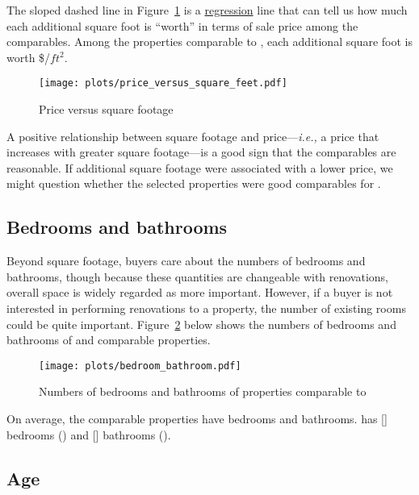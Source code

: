 \documentclass[
12pt, %
letterpaper, %
oneside, %
headinclude,footinclude, %
BCOR5mm, %
]{scrartcl}
\begin{document}
The sloped dashed line in Figure~\ref{fig:price_versus_square_feet} is a \href{https://en.wikipedia.org/wiki/Linear_regression}{regression} line that can tell us how much each additional square foot is ``worth'' in terms of sale price among the comparables.
Among the properties comparable to \PropertyName{}, each additional square foot is worth \$\MarginalPricePerFoot{}/$ft^2$. 

\begin{figure}
\centering
\caption{Price versus square footage} \label{fig:price_versus_square_feet}  
\texttt{[image: plots/price\_versus\_square\_feet.pdf]} 
\end{figure}

A positive relationship between square footage and price---\textit{i.e.,} a price that increases with greater square footage---is a good sign that the comparables are reasonable. If additional square footage were associated with a lower price, we might question whether the selected properties were good comparables for \PropertyName{}. 

\subsection{Bedrooms and bathrooms}
Beyond square footage, buyers care about the numbers of bedrooms and bathrooms, though because these quantities are changeable with renovations, overall space is widely regarded as more important.
However, if a buyer is not interested in performing renovations to a property, the number of existing rooms could be quite important.
Figure~\ref{fig:bedroom_bathroom} below shows the numbers of bedrooms and bathrooms of \PropertyName{} and comparable properties. 

\begin{figure}
\centering
\caption{Numbers of bedrooms and bathrooms of properties comparable to \PropertyName{}} \label{fig:bedroom_bathroom}  
\texttt{[image: plots/bedroom\_bathroom.pdf]} 
\end{figure}

On average, the comparable properties have \AverageBedrooms{} bedrooms and \AverageBaths{} bathrooms. \PropertyName{} has [] bedrooms (\NumberOfBedrooms{}) and [] bathrooms (\NumberOfBaths{}).

\subsection{Age}
\end{document}
